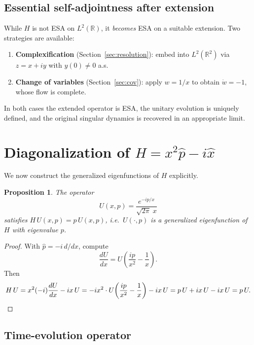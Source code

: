 \documentclass[11pt,a4paper]{article}
\newtheorem{proposition}[theorem]{Proposition}
\newcommand{\Rset}{\mathbb{R}}
\begin{document}
\subsection{Essential self-adjointness after extension}

While $H$ is not ESA on $L^{2}(\Rset)$, it \emph{becomes} ESA on a
suitable extension.  Two strategies are available:

\begin{enumerate}
  \item \textbf{Complexification} (Section~\ref{sec:resolution}): embed
    into $L^{2}(\Rset^{2})$ via $z=x+iy$ with $y(0)\neq 0$ a.s.
  \item \textbf{Change of variables} (Section~\ref{sec:cov}): apply
    $w=1/x$ to obtain $\dot{w}=-1$, whose flow is complete.
\end{enumerate}

In both cases the extended operator is ESA, the unitary evolution is
uniquely defined, and the original singular dynamics is recovered in an
appropriate limit.

\section{Diagonalization of $H=x^{2}\hat{p}-i\hat{x}$}\label{sec:diagonalization}

We now construct the generalized eigenfunctions of $H$ explicitly.

\begin{proposition}
The operator
\begin{equation}\label{eq:U-diag}
  U(x,p)=\frac{e^{-ip/x}}{\sqrt{2\pi}\;x}
\end{equation}
satisfies $H\,U(x,p)=p\,U(x,p)$, i.e.\ $U(\cdot,p)$ is a generalized
eigenfunction of $H$ with eigenvalue $p$.
\end{proposition}

\begin{proof}
With $\hat{p}=-i\,d/dx$, compute
\[
  \frac{dU}{dx}
  =U\!\left(\frac{ip}{x^{2}}-\frac{1}{x}\right).
\]
Then
\[
  H\,U=x^{2}(-i)\frac{dU}{dx}-ix\,U
  =-ix^{2}\cdot U\!\left(\frac{ip}{x^{2}}-\frac{1}{x}\right)-ix\,U
  =p\,U+ix\,U-ix\,U=p\,U.\qedhere
\]
\end{proof}

\subsection{Time-evolution operator}
\end{document}
